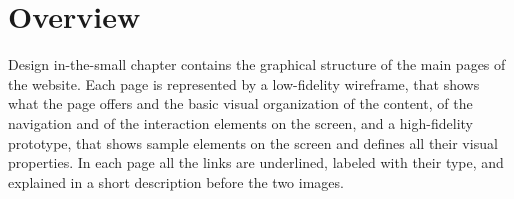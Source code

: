 \documentclass[../../DD.tex]{subfiles}
\begin{document}
\section{Overview}
	Design in-the-small chapter contains the graphical structure of the main pages of the website. Each page is represented by a low-fidelity wireframe, that shows what the page offers and the basic visual organization of the content, of the navigation and of the interaction elements on the screen, and a high-fidelity prototype, that shows sample elements on the screen and defines all their visual properties. In each page all the links are underlined, labeled with their type, and explained in a short description before the two images.
\end{document}
